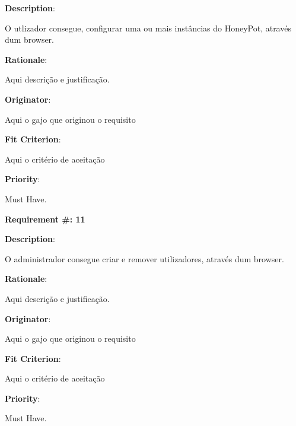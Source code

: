 \begin{description}
\item \textbf{Description}:

O utlizador consegue, configurar uma ou mais instâncias do HoneyPot, através dum browser.

\item \textbf{Rationale}:

Aqui descrição e justificação. \\
\item \textbf{Originator}:

Aqui o gajo que originou o requisito\\

\item \textbf{Fit Criterion}:

Aqui o critério de aceitação \\

\item \textbf{Priority}:

Must Have. \\

\end{description}

\pagebreak






\begin{minipage}{0.55\textwidth}
\begin{flushleft}\textbf{Requirement \#: 11}\end{flushleft}
\end{minipage}
\begin{minipage}{0.4\textwidth}
\end{minipage}

\begin{description}
\item \textbf{Description}:

O administrador consegue criar e remover utilizadores, através dum browser.


\item \textbf{Rationale}:

Aqui descrição e justificação. \\
\item \textbf{Originator}:

Aqui o gajo que originou o requisito\\

\item \textbf{Fit Criterion}:

Aqui o critério de aceitação \\

\item \textbf{Priority}:

Must Have. \\

\end{description}

